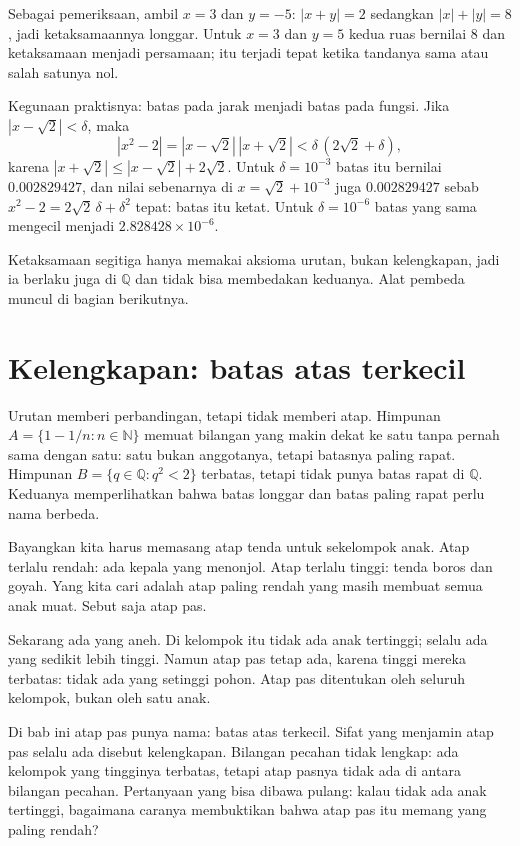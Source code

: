 Sebagai pemeriksaan, ambil $x=3$ dan $y=-5$: $|x+y|=2$ sedangkan $|x|+|y|=8$, jadi
ketaksamaannya longgar. Untuk $x=3$ dan $y=5$ kedua ruas bernilai $8$ dan ketaksamaan
menjadi persamaan; itu terjadi tepat ketika tandanya sama atau salah satunya nol.

Kegunaan praktisnya: batas pada jarak menjadi batas pada fungsi. Jika $|x-\sqrt2|<\delta$,
maka
\[
|x^2-2|=|x-\sqrt2|\,|x+\sqrt2|<\delta\,(2\sqrt2+\delta),
\]
karena $|x+\sqrt2|\le|x-\sqrt2|+2\sqrt2$. Untuk $\delta=10^{-3}$ batas itu bernilai
$0.002829427$, dan nilai sebenarnya di $x=\sqrt2+10^{-3}$ juga $0.002829427$ sebab
$x^2-2=2\sqrt2\,\delta+\delta^2$ tepat: batas itu ketat. Untuk $\delta=10^{-6}$ batas
yang sama mengecil menjadi $2.828428\times10^{-6}$.


Ketaksamaan segitiga hanya memakai aksioma urutan, bukan kelengkapan, jadi ia berlaku
juga di $\mathbb{Q}$ dan tidak bisa membedakan keduanya. Alat pembeda muncul di bagian
berikutnya.

\section{Kelengkapan: batas atas terkecil}

Urutan memberi perbandingan, tetapi tidak memberi atap. Himpunan
$A=\{1-1/n: n\in\mathbb{N}\}$ memuat bilangan yang makin dekat ke satu tanpa pernah
sama dengan satu: satu bukan anggotanya, tetapi batasnya paling rapat. Himpunan
$B=\{q\in\mathbb{Q}: q^2<2\}$ terbatas, tetapi tidak punya batas rapat di
$\mathbb{Q}$. Keduanya memperlihatkan bahwa batas longgar dan batas paling rapat perlu
nama berbeda.

\begin{untukanak}
Bayangkan kita harus memasang atap tenda untuk sekelompok anak. Atap terlalu rendah:
ada kepala yang menonjol. Atap terlalu tinggi: tenda boros dan goyah. Yang kita cari
adalah atap paling rendah yang masih membuat semua anak muat. Sebut saja atap pas.

Sekarang ada yang aneh. Di kelompok itu tidak ada anak tertinggi; selalu ada yang
sedikit lebih tinggi. Namun atap pas tetap ada, karena tinggi mereka terbatas: tidak
ada yang setinggi pohon. Atap pas ditentukan oleh seluruh kelompok, bukan oleh satu
anak.

Di bab ini atap pas punya nama: batas atas terkecil. Sifat yang menjamin atap pas
selalu ada disebut kelengkapan. Bilangan pecahan tidak lengkap: ada kelompok yang
tingginya terbatas, tetapi atap pasnya tidak ada di antara bilangan pecahan. Pertanyaan
yang bisa dibawa pulang: kalau tidak ada anak tertinggi, bagaimana caranya membuktikan
bahwa atap pas itu memang yang paling rendah?
\end{untukanak}

